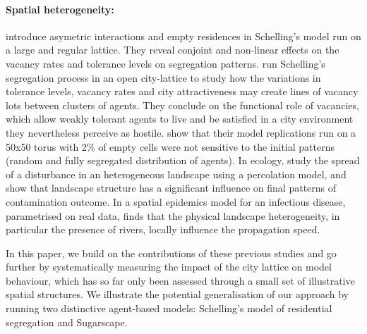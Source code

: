 \documentclass[Royal,sageh,times]{sagej}
\begin{document}

\paragraph{Spatial heterogeneity:} \citet{StaufferSolomon2007} introduce asymetric interactions and empty residences in Schelling's model run on a large and regular lattice. They reveal conjoint and non-linear effects on the vacancy rates and tolerance levels on segregation patterns. \citet{Gauvinetal2010} run Schelling's segregation process in an open city-lattice to study how the variations in tolerance levels, vacancy rates and city attractiveness may create lines of vacancy lots between clusters of agents. They conclude on the functional role of vacancies, which allow weakly tolerant agents to live and be satisfied in a city environment they nevertheless perceive as hostile. \citet{HatnaBenenson2012} show that their model replications run on a 50x50 torus with 2\% of empty cells were not sensitive to the initial patterns (random and fully segregated distribution of agents). In ecology, \citet{smith2002predicting} study the spread of a disturbance in an heterogeneous landscape using a percolation model, and show that landscape structure has a significant influence on final patterns of contamination outcome. In a spatial epidemics model for an infectious disease, parametrised on real data, \citet{smith2002predicting} finds that the physical landscape heterogeneity, in particular the presence of rivers, locally influence the propagation speed.





In this paper, we build on the contributions of these previous studies and go further by systematically measuring the impact of the city lattice on model behaviour, which has so far only been assessed through a small set of illustrative spatial structures. We illustrate the potential generalisation of our approach by running two distinctive agent-based models: Schelling's model of residential segregation and Sugarscape.
\end{document}
